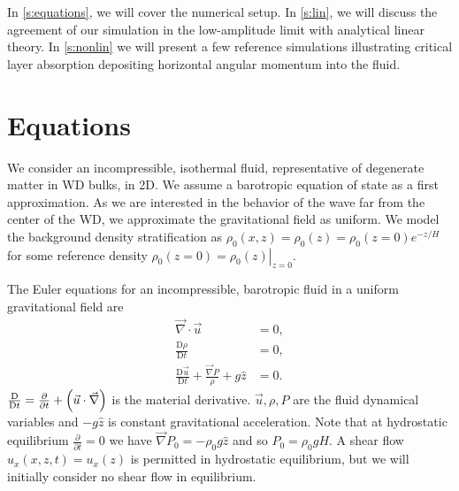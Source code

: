 \documentclass[twocolumn,
        nofootinbib, %
        usenames, %
        aps,
        prd,
        dvipsnames %
    ]{revtex4-1}%
\newcommand*{\pd}[2]{\frac{\partial#1}{\partial#2}}
\newcommand*{\md}[2]{\frac{\mathrm{D}#1}{\mathrm{D}#2}}
\newcommand*{\at}[1]{\left.#1\right|}
\DeclarePairedDelimiter\p{\lparen}{\rparen}
\begin{document}

In \autoref{s:equations}, we will cover the numerical setup. In \autoref{s:lin}, we
will discuss the agreement of our simulation in the low-amplitude limit with
analytical linear theory. In \autoref{s:nonlin} we will present a few reference
simulations illustrating critical layer absorption depositing horizontal angular
momentum into the fluid.

\section{Equations}\label{s:equations}

We consider an incompressible, isothermal fluid, representative of degenerate
matter in WD bulks, in 2D. We assume a barotropic equation of state as a first
approximation. As we are interested in the behavior of the wave far from the
center of the WD, we approximate the gravitational field as uniform. We model
the background density stratification as $\rho_0(x, z) = \rho_0(z) = \rho_0(z=0)
e^{-z/H}$ for some reference density $\rho_0(z=0) = \at{\rho_0(z)}_{z = 0}$.

The Euler equations for an incompressible, barotropic fluid in a uniform
gravitational field are
\begin{subequations}\label{se:fc_orig}
    \begin{align}
        \vec{\nabla} \cdot \vec{u} &= 0,\\
        \md{\rho}{t} &= 0 ,\label{eq:fc_density}\\
        \md{\vec{u}}{t} + \frac{\vec{\nabla}P}{\rho} + g\hat{z} &= 0.
    \end{align}
\end{subequations}
$\md{}{t} = \pd{}{t} + \p*{\vec{u} \cdot \vec{\nabla}}$ is the material
derivative. $\vec{u}, \rho, P$ are the fluid dynamical variables and $-g\hat{z}$
is constant gravitational acceleration. Note that at hydrostatic equilibrium
$\pd{}{t} = 0$ we have $\vec{\nabla}P_0 = -\rho_0 g\hat{z}$ and so $P_0 = \rho_0
gH$. A shear flow $u_x(x, z, t) = u_x(z)$ is permitted in hydrostatic
equilibrium, but we will initially consider no shear flow in equilibrium.
\end{document}
